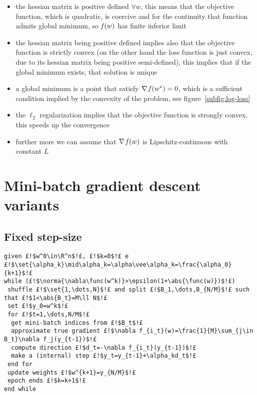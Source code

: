 \begin{itemize}
\item the hessian matrix is positive defined $\forall w$, this means that the objective function, which is quadratic, is coercive and for the continuity that function admits global minimum, so $\operatorname*{\mathit{f}}(w)$ has finite inferior limit
\item the hessian matrix being positive defined implies also that the objective function is strictly convex (on the other hand the loss function is just convex, due to its hessian matrix being positive semi-defined), this implies that if the global minimum exists, that solution is unique
\item a global minimum is a point that satisfy $\nabla\operatorname*{\mathit{f}}(w^\ast)=0$, which is a sufficient condition implied by the convexity of the problem, see figure~\vref{subfig:log-loss}
\item the $\ell_2$ regularization implies that the objective function is strongly convex, this speeds up the convergence
\item further more we can assume that $\nabla\operatorname*{\mathit{f}}(w)$ is Lipschitz-continuous with constant $L$
\end{itemize}


\cleardoublepage
\section{Mini-batch gradient descent variants}

\subsection{Fixed step-size}

\begin{lstlisting}[style=simple,caption={Mini-batch Gradient Descent with fixed or decreasing step-size},label=code:SGD-fix-decr]
given £!$w^0\in\R^n$!£, £!$k=0$!£ e £!$\set{\alpha_k}\mid\alpha_k=\alpha\vee\alpha_k=\frac{\alpha_0}{k+1}$!£
while (£!$\norma{\nabla\func(w^k)}>\epsilon(1+\abs{\func(w)})$!£)
 shuffle £!$\set{1,\dots,N}$!£ and split £!$B_1,\dots,B_{N/M}$!£ such that £!$1<\abs{B_t}=M\ll N$!£
 set £!$y_0=w^k$!£
 for £!$t=1,\dots,N/M$!£
  get mini-batch indices from £!$B_t$!£
  approximate true gradient £!$\nabla f_{i_t}(w)=\frac{1}{M}\sum_{j\in B_t}\nabla f_j(y_{t-1})$!£
  compute direction £!$d_t=-\nabla f_{i_t}(y_{t-1})$!£
  make a (internal) step £!$y_t=y_{t-1}+\alpha_kd_t$!£
 end for
 update weights £!$w^{k+1}=y_{N/M}$!£
 epoch ends £!$k=k+1$!£
end while
\end{lstlisting}

